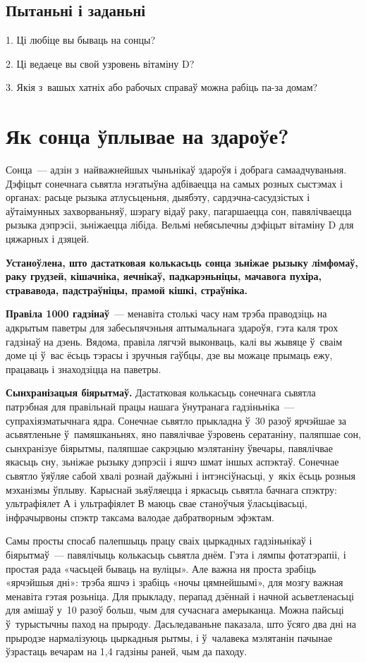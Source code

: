 \subsection*{Пытаньні і заданьні}

1. Ці любіце вы бываць на сонцы?

2. Ці ведаеце вы свой узровень вітаміну D?

3. Якія з~вашых хатніх або рабочых справаў можна рабіць па-за домам?


\section{Як сонца ўплывае на здароўе?}

Сонца~--- адзін з~найважнейшых чыньнікаў здароўя і добрага самаадчуваньня. Дэфіцыт сонечнага сьвятла нэгатыўна адбіваецца на самых розных сыстэмах і органах: расьце рызыка атлусьценьня, дыябэту, сардэчна-сасудзістых і аўтаімунных захворваньняў, шэрагу відаў раку, пагаршаецца сон, павялічваецца рызыка дэпрэсіі, зьніжаецца лібіда. Вельмі небясьпечны дэфіцыт вітаміну D для цяжарных і дзяцей.

\textbf{Устаноўлена, што дастатковая колькасьць сонца зьніжае рызыку лімфомаў, раку грудзей, кішачніка, яечнікаў, падкарэньніцы, мачавога пухіра, стрававода, падстраўніцы, прамой кішкі, страўніка.}

\textbf{Правіла 1000 гадзінаў}~--- менавіта столькі часу нам трэба праводзіць на адкрытым паветры для забесьпячэньня аптымальнага здароўя, гэта каля трох гадзінаў на дзень. Вядома, правіла лягчэй выконваць, калі вы жывяце ў~сваім доме ці ў~вас ёсьць тэрасы і зручныя гаўбцы, дзе вы можаце прымаць ежу, працаваць і знаходзіцца на паветры.

\textbf{Сынхранізацыя біярытмаў.} Дастатковая колькасьць сонечнага сьвятла патрэбная для правільнай працы нашага ўнутранага гадзіньніка~--- супрахіязматычнага ядра. Сонечнае сьвятло прыкладна ў~30 разоў ярчэйшае за асьвятленьне ў~памяшканьнях, яно павялічвае ўзровень сератаніну, паляпшае сон, сынхранізуе біярытмы, паляпшае сакрэцыю мэлятаніну ўвечары, павялічвае якасьць сну, зьніжае рызыку дэпрэсіі і яшчэ шмат іншых аспэктаў. Сонечнае сьвятло ўяўляе сабой хвалі рознай даўжыні і інтэнсіўнасьці, у~якіх ёсьць розныя мэханізмы ўплыву. Карыснай зьяўляецца і яркасьць сьвятла бачнага спэктру: ультрафіялет А і ультрафіялет В маюць свае станоўчыя ўласьцівасьці, інфрачырвоны спэктр таксама валодае дабратворным эфэктам.

Самы просты спосаб палепшыць працу сваіх цыркадных гадзіньнікаў і біярытмаў~--- павялічыць колькасьць сьвятла днём. Гэта і лямпы фотатэрапіі, і простая рада «часьцей бываць на вуліцы». Але важна ня проста зрабіць «ярчэйшыя дні»: трэба яшчэ і зрабіць «ночы цямнейшымі», для мозгу важная менавіта гэтая розьніца. Для прыкладу, перапад дзённай і начной асьветленасьці для амішаў у~10 разоў больш, чым для сучаснага амерыканца. Можна пайсьці ў~турыстычны паход на прыроду. Дасьледаваньне паказала, што ўсяго два дні на прыродзе нармалізуюць цыркадныя рытмы, і ў~чалавека мэлятанін пачынае ўзрастаць вечарам на 1,4 гадзіны раней, чым да паходу.

